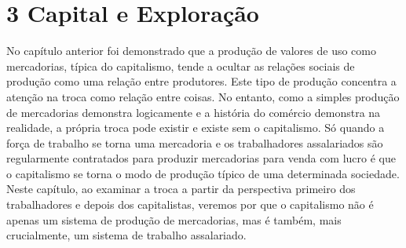 \chapter{3 Capital e Exploração}\label{3 Capital e Exploração}
 \par 
No capítulo anterior foi demonstrado que a produção de valores de uso como mercadorias, típica do capitalismo, tende a ocultar as relações sociais de produção como uma relação entre produtores. Este tipo de produção concentra a atenção na troca como relação entre coisas. No entanto, como a simples produção de mercadorias demonstra logicamente e a história do comércio demonstra na realidade, a própria troca pode existir e existe sem o capitalismo. Só quando a força de trabalho se torna uma mercadoria e os trabalhadores assalariados são regularmente contratados para produzir mercadorias para venda com lucro é que o capitalismo se torna o modo de produção típico de uma determinada sociedade. Neste capítulo, ao examinar a troca a partir da perspectiva primeiro dos trabalhadores e depois dos capitalistas, veremos por que o capitalismo não é apenas um sistema de produção de mercadorias, mas é também, mais crucialmente, um sistema de trabalho assalariado.
 \par 
